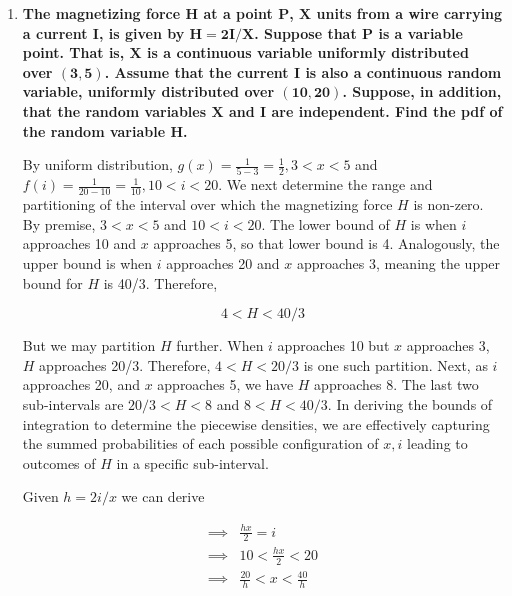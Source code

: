 \documentclass[10pt, oneside]{article}
\begin{document}
\begin{enumerate}[label=6.\arabic*]
\begin{proof}
($\impliedby$) By premise, $g(x | y) = g(x)$ and $h(y | x) = h(y)$. By definition and premise, $g(x | y) = \frac{f(x,y)}{h(y)} = g(x)$ and $h(y | x) = \frac{f(x,y)}{g(x)} = h(y)$, which both imply $f(x,y) = g(x) h(y)$, or the independence of $X,Y$.

\end{proof}

\item  \begin{tcolorbox}[
  colback=Cerulean!5!white,
  colframe=Cerulean!75!black]
\textbf{The magnetizing force $\bm{H}$ at a point $\bm{P}$, $\bm{X}$ units from a wire carrying a current $\bm{I}$, is given by $\bm{H = 2I / X}$. Suppose that $\bm{P}$ is a variable point. That is, $\bm{X}$ is a continuous variable uniformly distributed over $\bm{(3,5)}$. Assume that the current $\bm{I}$ is also a continuous random variable, uniformly distributed over $\bm{(10,20)}$. Suppose, in addition, that the random variables $\bm{X}$ and $\bm{I}$ are independent. Find the pdf of the random variable $\bm{H}$.}
\end{tcolorbox}

By uniform distribution, $g(x) = \frac{1}{5 - 3} = \frac{1}{2}, 3 < x < 5$ and $f(i) = \frac{1}{20-10} = \frac{1}{10}, 10 < i < 20$. We next determine the range and partitioning of the interval over which the magnetizing force $H$ is non-zero. By premise, $3 < x < 5$ and $10 < i < 20$. The lower bound of $H$ is when $i$ approaches 10 and $x$ approaches 5, so that lower bound is 4. Analogously, the upper bound is when $i$ approaches 20 and $x$ approaches 3, meaning the upper bound for $H$ is 40/3. Therefore,

\[ 4 < H < 40/3 \]

But we may partition $H$ further. When $i$ approaches 10 but $x$ approaches 3, $H$ approaches 20/3. Therefore, $4 < H < 20/3$ is one such partition. Next, as $i$ approaches 20, and $x$ approaches 5, we have $H$ approaches 8. The last two sub-intervals are $20/3 < H < 8$ and $8 < H < 40/3$. In deriving the bounds of integration to determine the piecewise densities, we are effectively capturing the summed probabilities of each possible configuration of $x, i$ leading to outcomes of $H$ in a specific sub-interval.

Given $h = 2i/x$ we can derive

\begin{align*}
\implies& \frac{hx}{2} = i \\
\implies& 10 < \frac{hx}{2} < 20 \\
\implies& \frac{20}{h} < x < \frac{40}{h}
\end{align*}


\end{enumerate}
\end{document}
